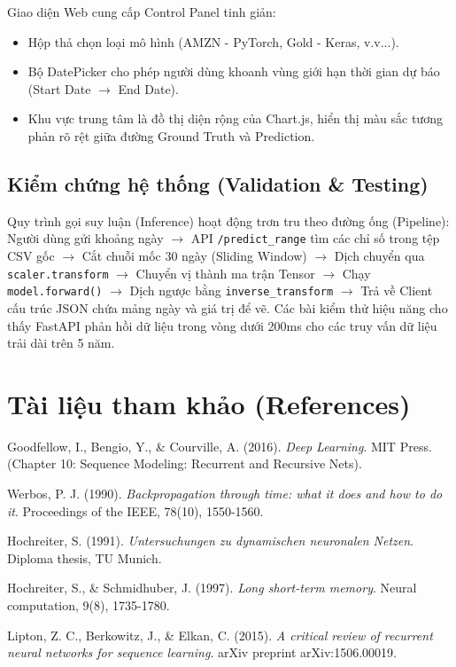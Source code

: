 \documentclass[12pt,a4paper]{article}
\begin{document}
Giao diện Web cung cấp Control Panel tinh giản:
\begin{itemize}
    \item Hộp thả chọn loại mô hình (AMZN - PyTorch, Gold - Keras, v.v...).
    \item Bộ DatePicker cho phép người dùng khoanh vùng giới hạn thời gian dự báo (Start Date $\rightarrow$ End Date).
    \item Khu vực trung tâm là đồ thị diện rộng của Chart.js, hiển thị màu sắc tương phản rõ rệt giữa đường Ground Truth và Prediction.
\end{itemize}

\subsection{Kiểm chứng hệ thống (Validation \& Testing)}
Quy trình gọi suy luận (Inference) hoạt động trơn tru theo đường ống (Pipeline): 
Người dùng gửi khoảng ngày $\to$ API \texttt{/predict\_range} tìm các chỉ số trong tệp CSV gốc $\to$ Cắt chuỗi mốc 30 ngày (Sliding Window) $\to$ Dịch chuyển qua \texttt{scaler.transform} $\to$ Chuyển vị thành ma trận Tensor $\to$ Chạy \texttt{model.forward()} $\to$ Dịch ngược bằng \texttt{inverse\_transform} $\to$ Trả về Client cấu trúc JSON chứa mảng ngày và giá trị để vẽ.
Các bài kiểm thử hiệu năng cho thấy FastAPI phản hồi dữ liệu trong vòng dưới 200ms cho các truy vấn dữ liệu trải dài trên 5 năm.

\newpage
\section*{Tài liệu tham khảo (References)}
\begin{enumerate}[label={[\arabic*]}]
    \item Goodfellow, I., Bengio, Y., \& Courville, A. (2016). \textit{Deep Learning}. MIT Press. (Chapter 10: Sequence Modeling: Recurrent and Recursive Nets).
    \item Werbos, P. J. (1990). \textit{Backpropagation through time: what it does and how to do it}. Proceedings of the IEEE, 78(10), 1550-1560.
    \item Hochreiter, S. (1991). \textit{Untersuchungen zu dynamischen neuronalen Netzen}. Diploma thesis, TU Munich.
    \item Hochreiter, S., \& Schmidhuber, J. (1997). \textit{Long short-term memory}. Neural computation, 9(8), 1735-1780.
    \item Lipton, Z. C., Berkowitz, J., \& Elkan, C. (2015). \textit{A critical review of recurrent neural networks for sequence learning}. arXiv preprint arXiv:1506.00019.
\end{enumerate}
\end{document}
